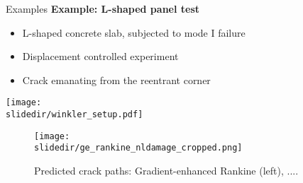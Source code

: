 
\begin{frame}{Examples}
    \textbf{Example: L-shaped panel test}
\begin{minipage}{1.0\textwidth}
\begin{minipage}{0.5\textwidth}
    \begin{itemize}
        \item L-shaped concrete slab, subjected to mode I failure
        \item Displacement controlled experiment
        \item Crack emanating from the reentrant corner
    \end{itemize}
\end{minipage}%
\hfill{}%
\begin{minipage}{0.4\textwidth}
    \centering
    \texttt{[image: \\slidedir/winkler\_setup.pdf]}%
\end{minipage}
\end{minipage}

\vfill

\begin{minipage}{1.0\textwidth}
    \begin{figure}[htpb]
        \centering
        \texttt{[image: \\slidedir/ge\_rankine\_nldamage\_cropped.png]}
        \caption{Predicted crack paths: Gradient-enhanced Rankine (left), ....}%
        \label{fig:name}
    \end{figure}
\end{minipage}
\end{frame}
